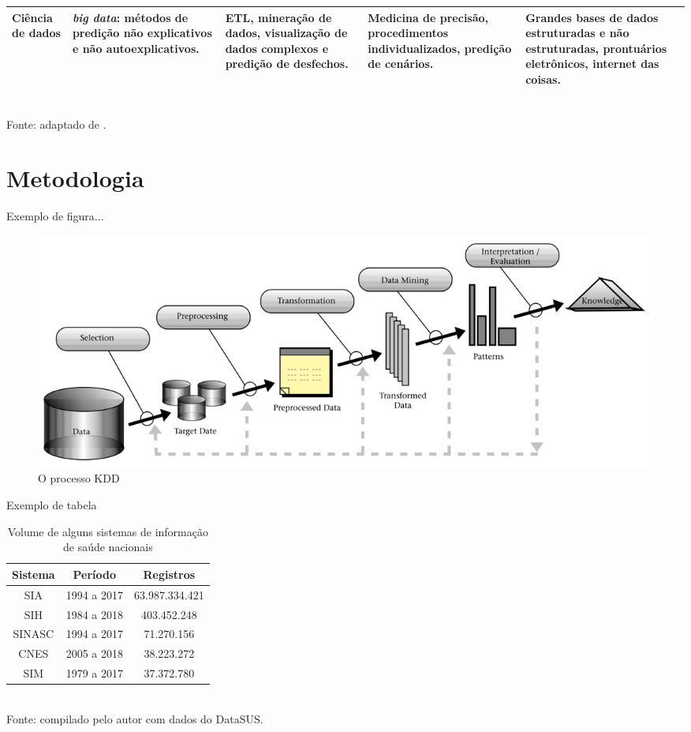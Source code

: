 \documentclass[
	12pt,				  %
	openright,	  %
	oneside,			%
	a4paper,			%
	english,			%
	french,				%
	spanish,			%
	brazil				%
	]{abntex2}
\newcommand{\bigdata}{\emph{big data}\xspace}
\begin{document}
\begin{landscape}
\begin{quadro}[h!]
\begin{tabular}{|p{5cm}|p{4.2cm}|p{4.2cm}|p{4.2cm}|p{4.2cm}|}
\hline 
Ciência de dados & \bigdata: métodos de predição não explicativos e não autoexplicativos. & ETL, mineração de dados, visualização de dados complexos e predição de desfechos. & Medicina de precisão, procedimentos individualizados, predição de cenários. & Grandes bases de dados estruturadas e não estruturadas, prontuários eletrônicos, internet das coisas. \\ 
\hline 
\end{tabular}{ 
\footnotesize
\\Fonte: adaptado de .
}
\end{quadro}
\end{landscape}
\newpage





\chapter{Metodologia}
\label{ch:metodologia}

Exemplo de figura...

\begin{figure}[htb]
  \caption{\label{fig:processo_kdd}O processo KDD}
  \begin{center}
    \includegraphics[width=.8\textwidth]{img/processo_kdd.png}
  \end{center}
\end{figure}


Exemplo de tabela

\begin{table}[htb]
\caption{\label{tabela:sistemas_volume} Volume de alguns sistemas de informação de saúde nacionais}
\small
\centering
\begin{tabular}{ccc}
\hline 
Sistema & Período & Registros \\ 
\hline
SIA & 1994 a 2017 & 63.987.334.421 \\
SIH & 1984 a 2018 & 403.452.248 \\
SINASC & 1994 a 2017 & 71.270.156 \\
CNES & 2005 a 2018 & 38.223.272\\
SIM & 1979 a 2017 &  37.372.780 \\
\hline 
\end{tabular} 
{
\footnotesize
\\Fonte: compilado pelo autor com dados do DataSUS.
}
\end{table}
\end{document}
